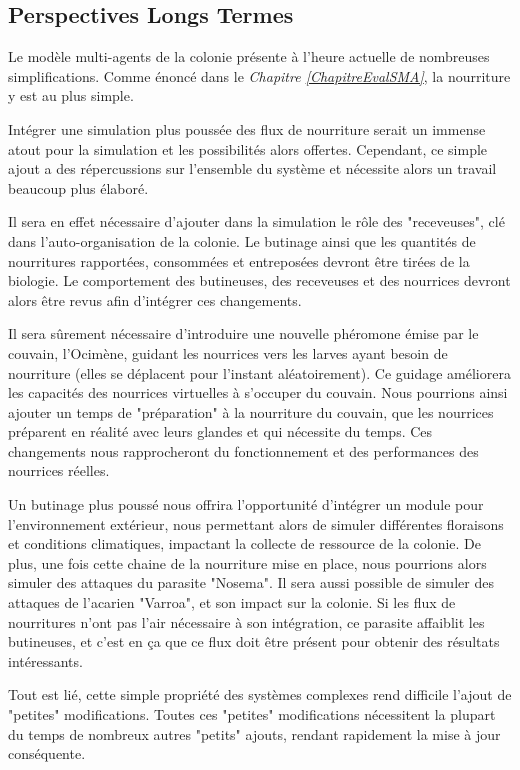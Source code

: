 	\subsection*{Perspectives Longs Termes}
	Le modèle multi-agents de la colonie présente à l'heure actuelle de nombreuses simplifications. Comme énoncé dans le \textit{Chapitre \ref{ChapitreEvalSMA}}, la nourriture y est au plus simple. 
	
	Intégrer une simulation plus poussée des flux de nourriture serait un immense atout pour la simulation et les possibilités alors offertes. Cependant, ce simple ajout a des répercussions sur l'ensemble du système et nécessite alors un travail beaucoup plus élaboré. 
	
	Il sera en effet nécessaire d'ajouter dans la simulation le rôle des "receveuses", clé dans l'auto-organisation de la colonie. Le butinage ainsi que les quantités de nourritures rapportées, consommées et entreposées devront être tirées de la biologie. Le comportement des butineuses, des receveuses et des nourrices devront alors être revus afin d'intégrer ces changements.
	
	Il sera sûrement nécessaire d'introduire une nouvelle phéromone émise par le couvain, l'Ocimène, guidant les nourrices vers les larves ayant besoin de nourriture (elles se déplacent pour l'instant aléatoirement). Ce guidage améliorera les capacités des nourrices virtuelles à s'occuper du couvain. Nous pourrions ainsi ajouter un temps de "préparation" à la nourriture du couvain, que les nourrices préparent en réalité avec leurs glandes et qui nécessite du temps. Ces changements nous rapprocheront du fonctionnement et des performances des nourrices réelles.
	
	Un butinage plus poussé nous offrira l'opportunité d'intégrer un module pour l'environnement extérieur, nous permettant alors de simuler différentes floraisons et conditions climatiques, impactant la collecte de ressource de la colonie. De plus, une fois cette chaine de la nourriture mise en place, nous pourrions alors simuler des attaques du parasite "Nosema". Il sera aussi possible de simuler des attaques de l'acarien "Varroa", et son impact sur la colonie. Si les flux de nourritures n'ont pas l'air nécessaire à son intégration, ce parasite affaiblit les butineuses, et c'est en ça que ce flux doit être présent pour obtenir des résultats intéressants.
	
	Tout est lié, cette simple propriété des systèmes complexes rend difficile l'ajout de "petites" modifications. Toutes ces "petites" modifications nécessitent la plupart du temps de nombreux autres "petits" ajouts, rendant rapidement la mise à jour conséquente.
	